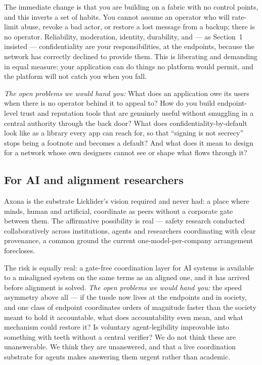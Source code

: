 \documentclass[nobib,justified]{tufte-handout}
\begin{document}
The immediate change is that you are building on a fabric with no control points,
and this inverts a set of habits. You cannot assume an operator who will
rate-limit abuse, revoke a bad actor, or restore a lost message from a backup;
there is no operator. Reliability, moderation, identity, durability, and --- as
Section~1 insisted --- confidentiality are your responsibilities, at the
endpoints, because the network has correctly declined to provide them. This is
liberating and demanding in equal measure: your application can do things no
platform would permit, and the platform will not catch you when you fall.

\emph{The open problems we would hand you:} What does an application owe its users
when there is no operator behind it to appeal to? How do you build endpoint-level
trust and reputation tools that are genuinely useful without smuggling in a
central authority through the back door? What does confidentiality-by-default look
like as a library every app can reach for, so that ``signing is not secrecy''
stops being a footnote and becomes a default? And what does it mean to design for
a network whose own designers cannot see or shape what flows through it?

\subsection{For AI and alignment researchers}

Axona is the substrate Licklider's vision required and never had: a place where
minds, human and artificial, coordinate as peers without a corporate gate between
them. The affirmative possibility is real --- safety research conducted
collaboratively across institutions, agents and researchers coordinating with
clear provenance, a common ground the current one-model-per-company arrangement
forecloses.

The risk is equally real: a gate-free coordination layer for AI systems is
available to a misaligned system on the same terms as an aligned one, and it has
arrived before alignment is solved. \emph{The open problems we would hand you:}
the speed asymmetry above all --- if the tussle now lives at the endpoints and in
society, and one class of endpoint coordinates orders of magnitude faster than the
society meant to hold it accountable, what does accountability even mean, and what
mechanism could restore it? Is voluntary agent-legibility improvable into
something with teeth without a central verifier? We do not think these are
unanswerable. We think they are unanswered, and that a live coordination substrate
for agents makes answering them urgent rather than academic.
\end{document}
